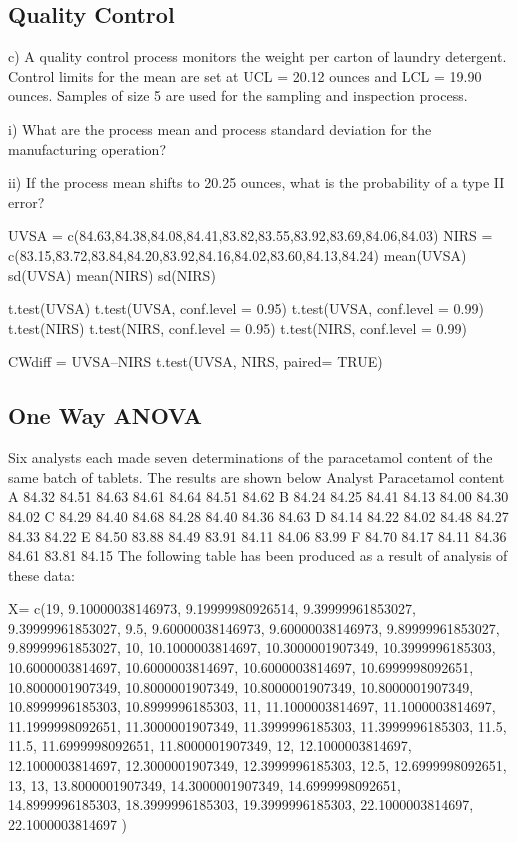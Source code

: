 \documentclass[a4paper,12pt]{article}
\begin{document}
\subsection{Quality Control}
c) A quality control process monitors the weight per carton of laundry detergent. 
Control limits for the mean are set at UCL = 20.12 ounces and LCL = 19.90 ounces. 
Samples of size 5 are used for the sampling and inspection process.

i) What are the process mean and process standard deviation for the manufacturing operation?

ii) If the process mean shifts to 20.25 ounces, what is the probability of a type II error? 	
   


UVSA = c(84.63,84.38,84.08,84.41,83.82,83.55,83.92,83.69,84.06,84.03) 
NIRS = c(83.15,83.72,83.84,84.20,83.92,84.16,84.02,83.60,84.13,84.24)
mean(UVSA)
sd(UVSA)
mean(NIRS)
sd(NIRS)


t.test(UVSA)
t.test(UVSA, conf.level = 0.95)
t.test(UVSA, conf.level = 0.99)
t.test(NIRS)
t.test(NIRS, conf.level = 0.95)
t.test(NIRS, conf.level = 0.99)

CWdiff = UVSA–NIRS
t.test(UVSA, NIRS, paired= TRUE)


\subsection{One Way ANOVA}

Six analysts each made seven determinations of the paracetamol content of the same batch of tablets.
The results are shown below
Analyst Paracetamol content
A 84.32 84.51 84.63 84.61 84.64 84.51 84.62
B 84.24 84.25 84.41 84.13 84.00 84.30 84.02
C 84.29 84.40 84.68 84.28 84.40 84.36 84.63
D 84.14 84.22 84.02 84.48 84.27 84.33 84.22
E 84.50 83.88 84.49 83.91 84.11 84.06 83.99
F 84.70 84.17 84.11 84.36 84.61 83.81 84.15
The following table has been produced as a result of analysis of these data:




X= c(19, 9.10000038146973, 9.19999980926514, 9.39999961853027, 9.39999961853027, 
9.5, 9.60000038146973, 9.60000038146973, 9.89999961853027, 9.89999961853027, 
10, 10.1000003814697, 10.3000001907349, 10.3999996185303, 10.6000003814697, 
10.6000003814697, 10.6000003814697, 10.6999998092651, 10.8000001907349, 
10.8000001907349, 10.8000001907349, 10.8000001907349, 10.8999996185303, 
10.8999996185303, 11, 11.1000003814697, 11.1000003814697, 11.1999998092651, 
11.3000001907349, 11.3999996185303, 11.3999996185303, 11.5, 11.5, 
11.6999998092651, 11.8000001907349, 12, 12.1000003814697, 12.1000003814697, 
12.3000001907349, 12.3999996185303, 12.5, 12.6999998092651, 13, 
13, 13.8000001907349, 14.3000001907349, 14.6999998092651, 14.8999996185303, 
18.3999996185303, 19.3999996185303, 22.1000003814697, 22.1000003814697
)
\end{document}
